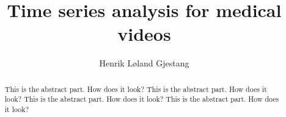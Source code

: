 \documentclass[english, a4paper]{report}
\title{Time series analysis for medical videos}
\author{Henrik Løland Gjestang}
\begin{document}

\duoforside[program={Computational Science},
  dept={Department of Informatics},
  option={Imaging and Biomedical Computing},
  long]




\begin{abstract}
This is the abstract part. How does it look? This is the abstract part. How does it look? This is the abstract part. How does it look? This is the abstract part. How does it look?
\end{abstract}

\tableofcontents
{}
\listoffigures
{}
\listoftables
\clearpage












\newpage
\printbibliography[heading=bibintoc]
\end{document}
